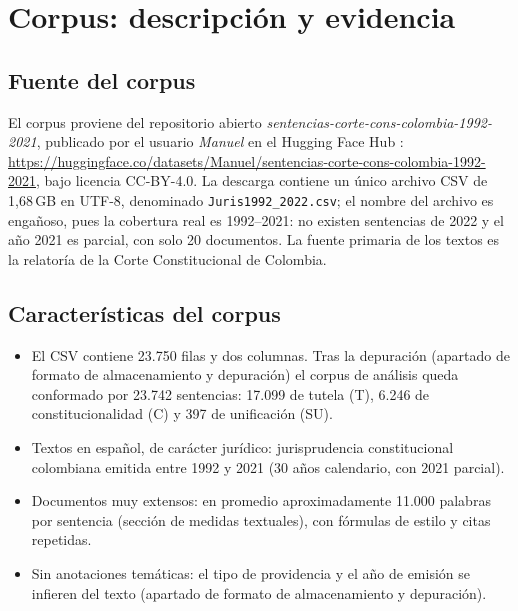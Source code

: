 \documentclass[stu,12pt,spanish,floatsintext,natbib]{apa7}
\begin{document}
\section{Corpus: descripción y evidencia}

\subsection{Fuente del corpus}
El corpus proviene del repositorio abierto
\emph{sentencias-corte-cons-colombia-1992-2021}, publicado por el usuario
\emph{Manuel} en el Hugging Face Hub
\citep{manuel2022sentencias}: \url{https://huggingface.co/datasets/Manuel/sentencias-corte-cons-colombia-1992-2021},
bajo licencia CC-BY-4.0. La descarga contiene un único archivo CSV de
1,68\,GB en UTF-8, denominado \texttt{Juris1992\_2022.csv}; el nombre del
archivo es engañoso, pues la cobertura real es 1992--2021: no existen
sentencias de 2022 y el año 2021 es parcial, con solo 20 documentos. La
fuente primaria de los textos es la relatoría de la Corte Constitucional
de Colombia.

\subsection{Características del corpus}
\begin{itemize}
  \item El CSV contiene 23.750 filas y dos columnas. Tras la depuración
    (apartado de formato de almacenamiento y depuración) el corpus de
    análisis queda conformado por 23.742 sentencias: 17.099 de tutela
    (T), 6.246 de constitucionalidad (C) y 397 de unificación (SU).
  \item Textos en español, de carácter jurídico: jurisprudencia
    constitucional colombiana emitida entre 1992 y 2021 (30 años
    calendario, con 2021 parcial).
  \item Documentos muy extensos: en promedio aproximadamente 11.000
    palabras por sentencia (sección de medidas textuales), con fórmulas
    de estilo y citas repetidas.
  \item Sin anotaciones temáticas: el tipo de providencia y el año de
    emisión se infieren del texto (apartado de formato de almacenamiento
    y depuración).
\end{itemize}
\end{document}
